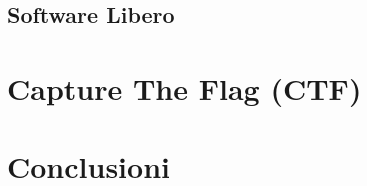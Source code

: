 \documentclass{beamer}
\begin{document}
\subsection{Software Libero}
\begin{frame}{\insertsubsection}
\end{frame}

\section{Capture The Flag (CTF)}
\begin{frame}{\insertsection}
\end{frame}

\section{Conclusioni}
\begin{frame}{\insertsection}
\end{frame}
\end{document}
